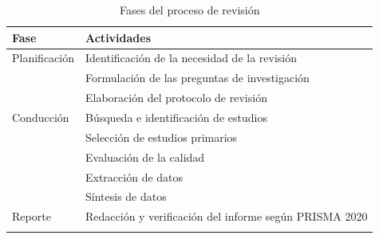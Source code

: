 \begin{table}[t]
\caption{Fases del proceso de revisión}\label{tab:proceso}
\begin{tabular*}{\textwidth}{@{\extracolsep\fill}ll}
\toprule
Fase & Actividades \\
\midrule
Planificación & Identificación de la necesidad de la revisión \\
 & Formulación de las preguntas de investigación \\
 & Elaboración del protocolo de revisión \\
Conducción & Búsqueda e identificación de estudios \\
 & Selección de estudios primarios \\
 & Evaluación de la calidad \\
 & Extracción de datos \\
 & Síntesis de datos \\
Reporte & Redacción y verificación del informe según PRISMA 2020 \\
\botrule
\end{tabular*}
\end{table}
